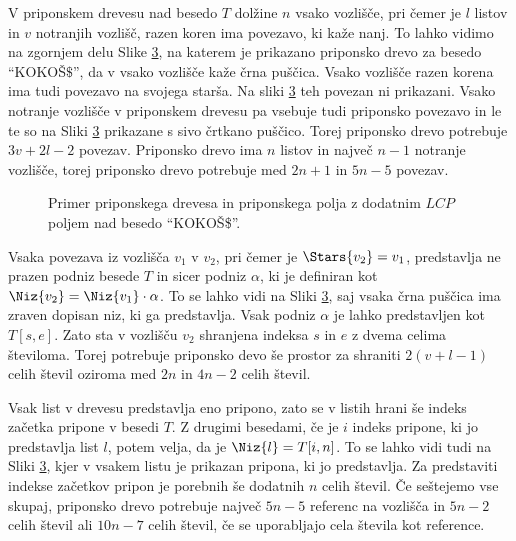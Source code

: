 V priponskem drevesu nad besedo $T$ dolžine $n$ vsako vozlišče, pri čemer je $l$ listov in $v$ notranjih vozlišč, razen koren ima povezavo, ki kaže nanj. To lahko vidimo na zgornjem delu Slike \ref{fig:SuffuxArray}, na katerem je prikazano priponsko drevo za besedo \enquote{KOKOŠ$\$$}, da v vsako vozlišče kaže črna puščica. Vsako vozlišče razen korena ima tudi povezavo na svojega starša. Na sliki \ref{fig:SuffuxArray} teh povezan ni prikazani. Vsako notranje vozlišče v priponskem drevesu pa vsebuje tudi priponsko povezavo in le te so na Sliki \ref{fig:SuffuxArray} prikazane s sivo črtkano puščico. Torej priponsko drevo potrebuje $3v+2l-2$ povezav. Priponsko drevo ima $n$ listov in največ $n-1$ notranje vozlišče, torej priponsko drevo potrebuje med $2n+1$ in $5n -5$ povezav.

\begin{figure}[htb]
    \begin{subfigure}[t]{\linewidth}
        
        
        \centering
        \subcaption*{}
        \label{fig:bSADrevo}
    \end{subfigure}
    \begin{subfigure}[t]{1\linewidth}        
        
        \centering
        \subcaption*{}
        \label{fig:bSAPolje}
    \end{subfigure}
    \caption{Primer priponskega drevesa in priponskega polja z dodatnim $LCP$ poljem nad besedo \enquote{KOKOŠ\$}.} 
    \label{fig:SuffuxArray}
\end{figure}

Vsaka povezava iz vozlišča $v_1$ v $v_2$, pri čemer je $\Stars{v_2}=v_1$, predstavlja ne prazen podniz besede $T$ in sicer podniz $\alpha$, ki je definiran kot $\Niz{v_2}=\Niz{v_1}\cdot\alpha$. To se lahko vidi na Sliki \ref{fig:SuffuxArray}, saj vsaka črna puščica ima zraven dopisan niz, ki ga predstavlja. Vsak podniz $\alpha$ je lahko predstavljen kot $T[s,e]$. Zato sta v vozlišču $v_2$ shranjena indeksa $s$ in $e$ z dvema celima številoma. Torej potrebuje priponsko devo še prostor za shraniti $2(v+l-1)$ celih števil oziroma med $2n$ in $4n-2$ celih števil.

Vsak list v drevesu predstavlja eno pripono, zato se v listih hrani še indeks začetka pripone v besedi $T$. Z drugimi besedami, če je $i$ indeks pripone, ki jo predstavlja list $l$, potem velja, da je $\Niz{l}=T[i,n]$. To se lahko vidi tudi na Sliki \ref{fig:SuffuxArray}, kjer v vsakem listu je prikazan pripona, ki jo predstavlja. Za predstaviti indekse začetkov pripon je porebnih še dodatnih $n$ celih števil. Če seštejemo vse skupaj, priponsko drevo potrebuje največ $5n-5$ referenc na vozlišča in $5n-2$ celih števil ali $10n-7$ celih števil, če se uporabljajo cela števila kot reference.

